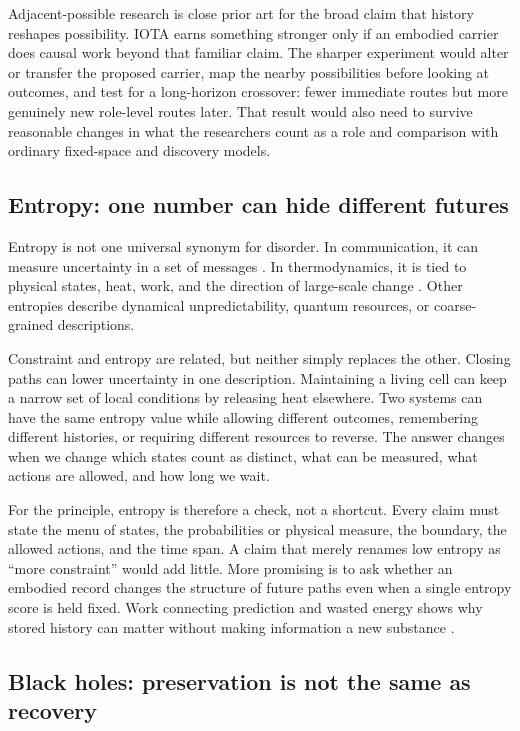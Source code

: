 \documentclass[11pt]{article}
\begin{document}
Adjacent-possible research is close prior art for the broad claim that history
reshapes possibility. IOTA earns something stronger only if an embodied carrier
does causal work beyond that familiar claim. The sharper experiment would
alter or transfer the proposed carrier, map the nearby possibilities before
looking at outcomes, and test for a long-horizon crossover: fewer immediate
routes but more genuinely new role-level routes later. That result would also
need to survive reasonable changes in what the researchers count as a role and
comparison with ordinary fixed-space and discovery models.

\subsection*{Entropy: one number can hide different futures}

Entropy is not one universal synonym for disorder. In communication, it can
measure uncertainty in a set of messages \citep{Shannon1948Communication}. In
thermodynamics, it is tied to physical states, heat, work, and the direction of
large-scale change \citep{Boltzmann1877Relationship,LiebYngvason1999SecondLaw}.
Other entropies describe dynamical unpredictability, quantum resources, or
coarse-grained descriptions.

Constraint and entropy are related, but neither simply replaces the other.
Closing paths can lower uncertainty in one description. Maintaining a living
cell can keep a narrow set of local conditions by releasing heat elsewhere.
Two systems can have the same entropy value while allowing different outcomes,
remembering different histories, or requiring different resources to reverse.
The answer changes when we change which states count as distinct, what can be
measured, what actions are allowed, and how long we wait.

For the principle, entropy is therefore a check, not a shortcut. Every claim
must state the menu of states, the probabilities or physical measure, the
boundary, the allowed actions, and the time span. A claim that merely renames
low entropy as ``more constraint'' would add little. More promising is to ask
whether an embodied record changes the structure of future paths even when a
single entropy score is held fixed. Work connecting prediction and wasted
energy shows why stored history can matter without making information a new
substance \citep{StillEtAl2012Prediction}.

\subsection*{Black holes: preservation is not the same as recovery}
\end{document}
